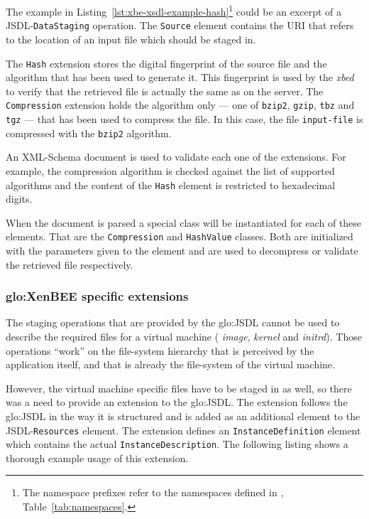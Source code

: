 The    example   in   Listing~\ref{lst:xbe-xsdl-example-hash}\footnote{The
  namespace    prefixes    refer   to    the    namespaces   defined    in
  \emph{},       Table~\ref{tab:namespaces}.}
could  be  an  excerpt  of  a  JSDL-\texttt{DataStaging}  operation.   The
\texttt{Source} element contains the URI that refers to the location of an
input file which should be staged in.

The \texttt{Hash}  extension stores the digital fingerprint  of the source
file and the algorithm that has been used to generate it. This fingerprint
is used by  the \emph{xbed} to verify that the  retrieved file is actually
the same  as on the  server. The \texttt{Compression} extension  holds the
algorithm only --- one  of \texttt{bzip2}, \texttt{gzip}, \texttt{tbz} and
\texttt{tgz} ---  that has been used  to compress the file.  In this case,
the  file  \texttt{input-file}   is  compressed  with  the  \texttt{bzip2}
algorithm.

An XML-Schema document is used to validate each one of the extensions. For
example,  the  compression  algorithm  is  checked  against  the  list  of
supported  algorithms and  the  content of  the  \texttt{Hash} element  is
restricted to hexadecimal digits.

\medskip

When the document is parsed a  special class will be instantiated for each
of    these   elements.    That    are   the    \texttt{Compression}   and
\texttt{HashValue} classes. Both are initialized with the parameters given
to the element  and are used to decompress or  validate the retrieved file
respectively.

\subsubsection{\gls{glo:XenBEE} specific extensions}

The staging operations  that are provided by the  \gls{glo:JSDL} cannot be
used  to  describe   the  required  files  for  a   virtual  machine  (\ie
\emph{image}, \emph{kernel} and  \emph{initrd}). Those operations ``work''
on the file-system hierarchy that  is perceived by the application itself,
and that is already the file-system of the virtual machine.

However, the virtual machine specific files  have to be staged in as well,
so there  was a need  to provide an  extension to the  \gls{glo:JSDL}. The
extension follows  the \gls{glo:JSDL} in the  way it is  structured and is
added as an additional element to the JSDL-\texttt{Resources} element. The
extension  defines an  \texttt{InstanceDefinition} element  which contains
the  actual \texttt{InstanceDescription}.  The  following listing  shows a
thorough example usage of this extension.

